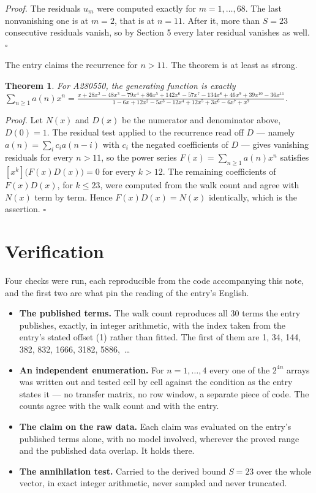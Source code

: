 \documentclass[11pt]{article}
\newtheorem{theorem}{Theorem}
\theoremstyle{definition}
\begin{document}
{\itshape Proof.} The residuals $u_m$ were computed exactly for $m = 1,\dots,68$. The last nonvanishing one is at $m = 2$, that is at $n = 11$. After it, more than $S = 23$ consecutive residuals vanish, so by Section 5 every later residual vanishes as well. $\square$

The entry claims the recurrence for $n > 11$. The theorem is at least as strong.

\begin{theorem} For A280550, the generating function is exactly $\sum_{n\ge 1} a(n)x^n = \frac{x + 28x^{2} - 48x^{3} - 79x^{4} + 86x^{5} + 142x^{6} - 57x^{7} - 134x^{8} + 46x^{9} + 39x^{10} - 36x^{11}}{1 - 6x + 12x^{2} - 5x^{3} - 12x^{4} + 12x^{5} + 3x^{6} - 6x^{7} + x^{9}}$.\end{theorem}

{\itshape Proof.} Let $N(x)$ and $D(x)$ be the numerator and denominator above, $D(0)=1$. The residual test applied to the recurrence read off $D$ --- namely $a(n) = \sum_i c_i a(n-i)$ with $c_i$ the negated coefficients of $D$ --- gives vanishing residuals for every $n > 11$, so the power series $F(x)=\sum_{n\ge 1}a(n)x^n$ satisfies $[x^k]\bigl(F(x)D(x)\bigr) = 0$ for every $k > 12$. The remaining coefficients of $F(x)D(x)$, for $k \le 23$, were computed from the walk count and agree with $N(x)$ term by term. Hence $F(x)D(x) = N(x)$ identically, which is the assertion. $\square$

\section{Verification}

Four checks were run, each reproducible from the code accompanying this note, and the first two are what pin the reading of the entry's English.

\begin{itemize}

\item {\bfseries The published terms.} The walk count reproduces all 30 terms the entry publishes, exactly, in integer arithmetic, with the index taken from the entry's stated offset (1) rather than fitted. The first of them are 1, 34, 144, 382, 832, 1666, 3182, 5886,~\dots

\item {\bfseries An independent enumeration.} For $n = 1,\dots,4$ every one of the $2^{4n}$ arrays was written out and tested cell by cell against the condition as the entry states it --- no transfer matrix, no row window, a separate piece of code. The counts agree with the walk count and with the entry.

\item {\bfseries The claim on the raw data.} Each claim was evaluated on the entry's published terms alone, with no model involved, wherever the proved range and the published data overlap. It holds there.

\item {\bfseries The annihilation test.} Carried to the derived bound $S = 23$ over the whole vector, in exact integer arithmetic, never sampled and never truncated.

\end{itemize}
\end{document}
